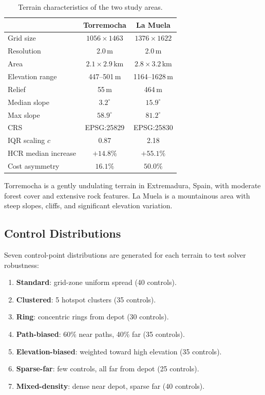 \documentclass[11pt,a4paper]{article}
\begin{document}
\begin{table}[H]
\centering
\caption{Terrain characteristics of the two study areas.}
\label{tab:terrain}
\begin{tabular}{lcc}
\toprule
& \textbf{Torremocha} & \textbf{La Muela} \\
\midrule
Grid size & $1056 \times 1463$ & $1376 \times 1622$ \\
Resolution & 2.0\,m & 2.0\,m \\
Area & $2.1 \times 2.9$\,km & $2.8 \times 3.2$\,km \\
Elevation range & 447--501\,m & 1164--1628\,m \\
Relief & 55\,m & 464\,m \\
Median slope & $3.2^\circ$ & $15.9^\circ$ \\
Max slope & $58.9^\circ$ & $81.2^\circ$ \\
CRS & EPSG:25829 & EPSG:25830 \\
IQR scaling $c$ & 0.87 & 2.18 \\
HCR median increase & $+14.8\%$ & $+55.1\%$ \\
Cost asymmetry & $16.1\%$ & $50.0\%$ \\
\bottomrule
\end{tabular}
\end{table}

Torremocha is a gently undulating terrain in Extremadura, Spain, with moderate forest cover and extensive rock features.
La Muela is a mountainous area with steep slopes, cliffs, and significant elevation variation.

\subsection{Control Distributions}

Seven control-point distributions are generated for each terrain to test solver robustness:
\begin{enumerate}[nosep]
  \item \textbf{Standard}: grid-zone uniform spread (40 controls).
  \item \textbf{Clustered}: 5 hotspot clusters (35 controls).
  \item \textbf{Ring}: concentric rings from depot (30 controls).
  \item \textbf{Path-biased}: 60\% near paths, 40\% far (35 controls).
  \item \textbf{Elevation-biased}: weighted toward high elevation (35 controls).
  \item \textbf{Sparse-far}: few controls, all far from depot (25 controls).
  \item \textbf{Mixed-density}: dense near depot, sparse far (40 controls).
\end{enumerate}
\end{document}
